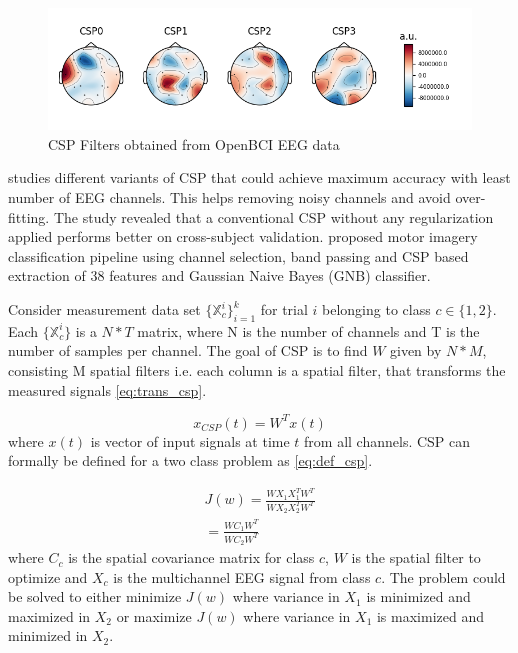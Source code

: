 \begin{figure}[H] 
    \begin{center}
    \includegraphics[width=1.0\textwidth]{images/obci_csp_filt.png}
    \caption{CSP Filters obtained from OpenBCI EEG data}
    \label{fig:obci_csp_filt}
\end{center}
\end{figure}

\cite{2017_EEGChannelSelection} studies different variants of CSP that could achieve maximum accuracy with least number of EEG channels. This helps removing noisy channels and avoid over-fitting. The study revealed that a conventional CSP without any regularization applied performs better on cross-subject validation. \cite{2017_MI_ML_SP} proposed motor imagery classification pipeline using channel selection, band passing and  CSP based extraction of 38 features and Gaussian Naive Bayes (GNB) classifier.

Consider measurement data set $\{\mathbb{X}^{i}_{c}\}^{k}_{i=1}$ for trial $i$ belonging to class $c \in\{1,2\}$. Each $\{\mathbb{X}^{i}_{c}\}$ is a $N * T$ matrix, where N is the number of channels and T is the number of samples per channel. The goal of CSP is to find $W$ given by $N * M$, consisting M spatial filters i.e. each column is a  spatial filter, that transforms the measured signals \ref{eq:trans_csp}.

\begin{equation} \label{eq:trans_csp}
    x_{CSP}(t) = W^{T}x(t)
\end{equation}
where $x(t)$ is vector of input signals at time $t$ from all channels. CSP can formally be defined for a two class problem as \ref{eq:def_csp}.

\begin{equation} \label{eq:def_csp}
    \begin{split}
        J(w) = \frac{WX_{1}X_{1}^TW^T}{WX_{2}X_{2}^TW^T} \\
         = \frac{WC_{1}W^T}{WC_{2}W^T}
    \end{split}
\end{equation}
where $C_{c}$ is the spatial covariance matrix for class $c$, $W$ is the spatial filter to optimize and $X_{c}$ is the multichannel EEG signal from class $c$. The problem could be solved to either minimize $J(w)$ where variance in $X_{1}$ is minimized and maximized in $X_{2}$ or maximize $J(w)$ where variance in $X_{1}$ is maximized and minimized in $X_{2}$.

